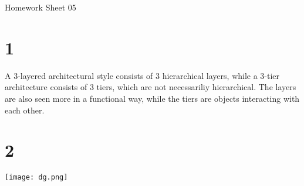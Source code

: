 \documentclass[11pt,a4paper]{article}
\begin{document}
\begin{center}
{\Large Homework Sheet 05}
\end{center}

\thispagestyle{empty}
\pagestyle{empty}

\section*{1}

A 3-layered architectural style consists of 3 hierarchical layers,
while a 3-tier architecture consists of 3 tiers, which are not
necessariliy hierarchical. The layers are also seen more in a functional
way, while the tiers are objects interacting with each other.

\section*{2}

\texttt{[image: dg.png]}
\end{document}
